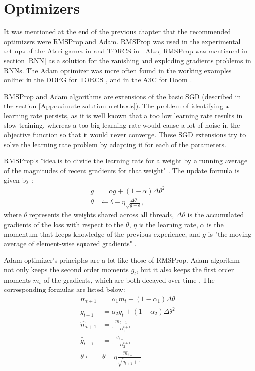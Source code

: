\section{Optimizers}
It was mentioned at the end of the previous chapter that the recommended optimizers were RMSProp and Adam. RMSProp was used in the experimental set-ups of the Atari games in \cite{DBLP:journals/corr/MnihKSGAWR13} and TORCS in \cite{DBLP:journals/corr/MnihBMGLHSK16}. Also, RMSProp was mentioned in section \ref{RNN} as a solution for the vanishing and exploding gradients problems in RNNs. The Adam optimizer was more often found in the working examples online: in the DDPG for TORCS \cite{DDPG_Torcs}, and in the A3C for Doom \cite{A3CDoom}.

RMSProp and Adam algorithms are extensions of the basic SGD (described in the section \ref{Approximate solution methods}). The problem of identifying a learning rate persists, as it is well known that a too low learning rate results in slow training, whereas a too big learning rate would cause a lot of noise in the objective function so that it would never converge. These SGD extensions try to solve the learning rate problem by adapting it for each of the parameters. 

RMSProp's "idea is to divide the learning rate for a weight by a running average of the magnitudes of recent gradients for that weight" \cite{RMSProp}. The update formula is given by \cite{DBLP:journals/corr/MnihBMGLHSK16}:
\begin{equation}\label{RMSPropUpdate}
\begin{aligned}
g&=\alpha g + (1-\alpha)\Delta \theta^2\\
\theta & \leftarrow \theta - \eta  \frac{\Delta \theta}{\sqrt{g+\epsilon}},
\end{aligned}
\end{equation}
where $\theta$ represents the weights shared across all threads, $\Delta \theta$ is the accumulated gradients of the loss with respect to the $\theta$, $\eta$ is the learning rate, $\alpha$ is the momentum that keeps knowledge of the previous experience, and $g$ is "the moving average of element-wise squared gradients" \cite{DBLP:journals/corr/MnihBMGLHSK16}.

Adam optimizer's principles are a lot like those of RMSProp. Adam algorithm not only keeps the second order moments $g_{t}$, but it also keeps the first order moments $m_{t}$ of the gradients, which are both decayed over time \cite{Optimizers}. The corresponding formulas are listed below:
\begin{equation}\label{Adam}
\begin{aligned}
m_{t+1}&=\alpha_{1} m_{t} + (1-\alpha_{1})\Delta \theta\\
g_{t+1}&=\alpha_{2} g_{t} + (1-\alpha_{2})\Delta \theta^2\\
\hat{m}_{t+1}&=\frac{m_{t+1}}{1-\alpha_{1}^{t+1}}  \\
\hat{g}_{t+1}&=\frac{g_{t+1}}{1-\alpha_{2}^{t+1}}  \\
\theta \leftarrow & \theta - \eta  \frac{\hat{m}_{t+1}}{\sqrt{\hat{g}_{t+1}+\epsilon}}
\end{aligned}
\end{equation}


